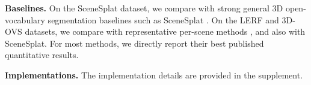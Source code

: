 \documentclass{article}
\begin{document}
\noindent\textbf{Baselines.}
On the SceneSplat dataset, we compare with strong general 3D open-vocabulary segmentation baselines such as SceneSplat \cite{li2025scenesplat,lee2025mosaic3d,jiang2024open,yang2024regionplc,ding2022language,peng2023openscene}. On the LERF and 3D-OVS datasets, we compare with representative per-scene methods \cite{drsplat25,cheng2024occamslgssimpleapproach}, and also with SceneSplat. For most methods, we directly report their best published quantitative results.

\noindent\textbf{Implementations.} The implementation details are provided in the supplement.
\end{document}
